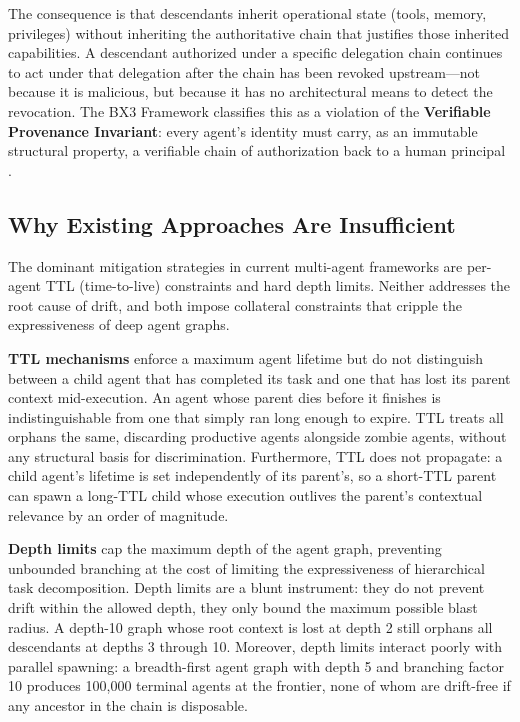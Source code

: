 The consequence is that descendants inherit operational state (tools, memory, privileges) without inheriting the authoritative chain that justifies those inherited capabilities. A descendant authorized under a specific delegation chain continues to act under that delegation after the chain has been revoked upstream—not because it is malicious, but because it has no architectural means to detect the revocation. The BX3 Framework classifies this as a violation of the \textbf{Verifiable Provenance Invariant}: every agent's identity must carry, as an immutable structural property, a verifiable chain of authorization back to a human principal \cite{bx3framework2026}.

\subsection{Why Existing Approaches Are Insufficient}

The dominant mitigation strategies in current multi-agent frameworks are per-agent TTL (time-to-live) constraints and hard depth limits. Neither addresses the root cause of drift, and both impose collateral constraints that cripple the expressiveness of deep agent graphs.

\textbf{TTL mechanisms} enforce a maximum agent lifetime but do not distinguish between a child agent that has completed its task and one that has lost its parent context mid-execution. An agent whose parent dies before it finishes is indistinguishable from one that simply ran long enough to expire. TTL treats all orphans the same, discarding productive agents alongside zombie agents, without any structural basis for discrimination. Furthermore, TTL does not propagate: a child agent's lifetime is set independently of its parent's, so a short-TTL parent can spawn a long-TTL child whose execution outlives the parent's contextual relevance by an order of magnitude.

\textbf{Depth limits} cap the maximum depth of the agent graph, preventing unbounded branching at the cost of limiting the expressiveness of hierarchical task decomposition. Depth limits are a blunt instrument: they do not prevent drift within the allowed depth, they only bound the maximum possible blast radius. A depth-10 graph whose root context is lost at depth 2 still orphans all descendants at depths 3 through 10. Moreover, depth limits interact poorly with parallel spawning: a breadth-first agent graph with depth 5 and branching factor 10 produces 100,000 terminal agents at the frontier, none of whom are drift-free if any ancestor in the chain is disposable.


